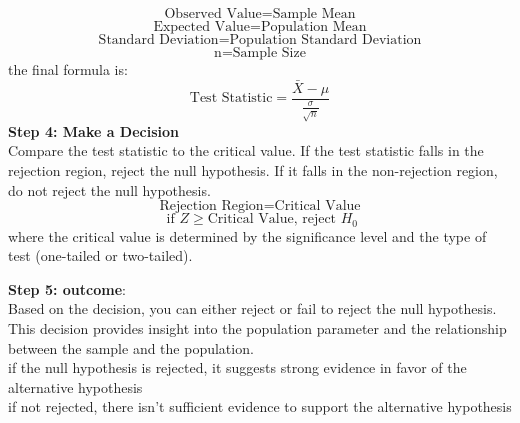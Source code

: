 \documentclass[a3paper,12pt]{extarticle} %
\begin{document}
    \[
    \text{Observed Value} = \text{Sample Mean}
    \]
    \[
    \text{Expected Value} = \text{Population Mean}
    \]
    \[
    \text{Standard Deviation} = \text{Population Standard Deviation}
    \]
    \[
    \text{n} = \text{Sample Size}
    \]
    the final formula is:
    \[
    \text{Test Statistic} = \frac{\bar{X} - \mu}{\frac{\sigma}{\sqrt{n}}}
    \]
    \subitem \textbf{Step 4: Make a Decision}
    \\ Compare the test statistic to the critical value. If the test statistic falls in the rejection region, reject the null hypothesis. If it falls in the non-rejection region, do not reject the null hypothesis.
    \[
    \text{Rejection Region} = \text{Critical Value}
    \]
    \[
    \text{ if } Z \geq \text{Critical Value} \text{, reject } H_0
    \]
    where the critical value is determined by the significance level and the type of test (one-tailed or two-tailed).
    
    \subitem \textbf{Step 5: outcome}:
    \\ Based on the decision, you can either reject or fail to reject the null hypothesis. This decision provides insight into the population parameter and the relationship between the sample and the population.
    \\ if the null hypothesis is rejected, it suggests strong evidence in favor of the alternative hypothesis
    \\ if not rejected, there isn't sufficient evidence to support the alternative hypothesis
\end{document}
